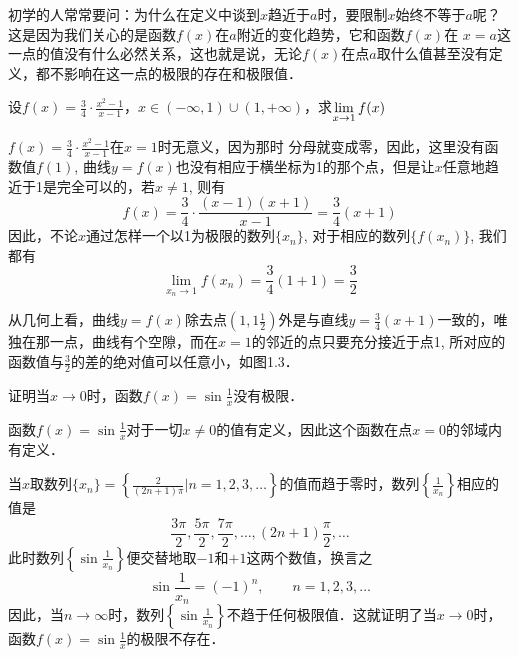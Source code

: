 初学的人常常要问：为什么在定义中谈到$x$趋近于$a$时，要限制$x$始终不等于$a$呢？这是因为我们关心的是函数$f(x)$在$a$附近的变化趋势，它和函数$f(x)$在
$x=a$这一点的值没有什么必然关系，这也就是说，无论$f(x)$在点$a$取什么值甚至没有定义，都不影响在这一点的极限的存在和极限值．

\begin{example}
设$f(x)=\frac{3}{4}\cdot \frac{x^2-1}{x-1}$，$x\in(-\infty,1)\cup(1,+\infty)$，求$\displaystyle\lim_{x\to 1}f(x)$
\end{example}

\begin{solution}
    $f(x)=\frac{3}{4}\cdot \frac{x^2-1}{x-1}$在$x=1$时无意义，因为那时
    分母就变成零，因此，这里没有函数值$f(1)$, 曲线$y=f(x)$也没有相应于横坐标为1的那个点，但是让$x$任意地趋近于1是完全可以的，若$x\ne 1$, 则有
  \[  f (x) =\frac{3}{4}\cdot  \frac{(x-1)(x+1)}{x-1}=\frac{3}{4}(x+1)\]
  因此，不论$x$通过怎样一个以1为极限的数列$\{x_n\}$, 对于相应的数列$\{f(x_n)\}$, 我们都有
  \[\lim_{x_n\to 1} f (x_n) =\frac{3}{4} (1+1) =\frac{3}{2}\]

    从几何上看，曲线$y=f(x)$除去点$\left(1,1\frac{1}{2}\right)$外是与直线$y=\frac{3}{4}(x+1)$一致的，唯独在那一点，曲线有个空隙，而在$x=1$的邻近的点只要充分接近于点1, 所对应的函数值与$\frac{3}{2}$的差的绝对值可以任意小，如图1.3．
\end{solution}
    
\begin{figure}[htp]
    \centering
{}
    \caption{}
\end{figure}

\begin{example}
证明当$x\to 0$时，函数$f(x)=\sin\frac{1}{x}$没有极限．
\end{example}

\begin{solution}
函数$f(x)=\sin\frac{1}{x}$对于一切$x\ne 0$的值有定义，因此这个函数在点$x=0$的邻域内有定义．

当$x$取数列$\{x_n\}=\left\{\frac{2}{(2n+1)\pi}\Big| n=1,2,3,\ldots\right\}$的值而趋于零时，数列$\left\{\frac{1}{x_n}\right\}$相应的值是
\[\frac{3\pi}{2},\frac{5\pi}{2},\frac{7\pi}{2},\ldots,(2n+1)\frac{\pi}{2},\ldots\]
此时数列$\left\{\sin\frac{1}{x_n}\right\}$便交替地取$-1$和$+1$这两个数值，换言之
\[\sin\frac{1}{x_n}=(-1)^n,\qquad n=1,2,3,\ldots\]
因此，当$n\to\infty$时，数列$\left\{\sin\frac{1}{x_n}\right\}$不趋于任何极限值．这就证明了当$x\to 0$时，函数$f(x)=\sin\frac{1}{x}$的极限不存在．
\end{solution}

